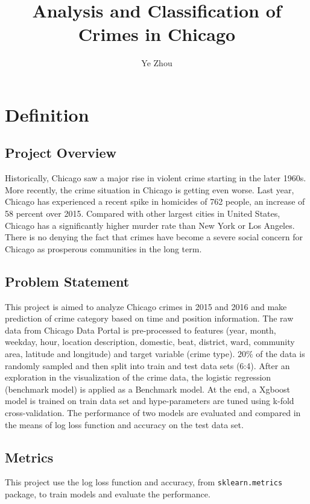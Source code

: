 \documentclass[12pt]{article}
\begin{document}
 
 
\title{Analysis and Classification of Crimes in Chicago}
\author{Ye Zhou}
\maketitle
 
\section{Definition}
\subsection{Project Overview}
Historically, Chicago saw a major rise in violent crime starting in the later 1960s. More recently, the crime situation in Chicago is getting even worse. Last year, Chicago has experienced a recent spike in homicides of 762 people, an increase of 58 percent over 2015. Compared with other largest cities in United States, Chicago has a significantly higher murder rate than New York or Los Angeles. There is no denying the fact that crimes have become a severe social concern for Chicago as prosperous communities in the long term. 
\subsection{Problem Statement}
This project is aimed to analyze Chicago crimes in 2015 and 2016 and make prediction of crime category based on time and position information. The raw data from Chicago Data Portal is pre-processed to features (year, month, weekday, hour, location description, domestic, beat, district, ward, community area, latitude and longitude) and target variable (crime type). $20\%$ of the data is randomly sampled and then split into train and test data sets (6:4). After an exploration in the visualization of the crime data, the logistic regression (benchmark model) is applied as a Benchmark model.  At the end, a Xgboost model is trained on train data set and hype-parameters are tuned using k-fold cross-validation. The performance of two models are evaluated and compared in the means of log loss function and accuracy on the test data set.

\subsection{Metrics} 
This project use the log loss function and accuracy, from \verb|sklearn.metrics| package, to train models and evaluate the performance.
\end{document}
